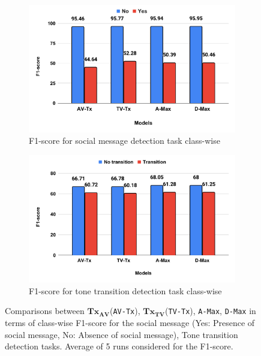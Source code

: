  \begin{figure}[h!]
\begin{subfigure}{.50\textwidth}
  \centering
  \includegraphics[width=\linewidth]{figures/multimodal_baselines_f1_score_social_message.pdf}
  \caption{F1-score for social message detection task class-wise}
  \label{class_wise_social_message_multimodal}
\end{subfigure}%
\begin{subfigure}{.50\textwidth}
  \centering
  \includegraphics[width=\linewidth]{figures/multimodal_baselines_f1_score_transition.pdf}
  \caption{F1-score for tone transition detection task class-wise}
  \label{class_wise_tone_transition_multimodal}
\end{subfigure}
\caption{Comparisons between $\mathbf{Tx_{AV}}$(\texttt{AV-Tx}), $\mathbf{Tx_{TV}}$(\texttt{TV-Tx}), \texttt{A-Max}, \texttt{D-Max} in terms of class-wise F1-score for the social message (Yes: Presence of social message, No: Absence of social message), Tone transition detection tasks. Average of 5 runs considered for the F1-score.}
\label{tone_transition_social_message_multimodal}
\end{figure}

